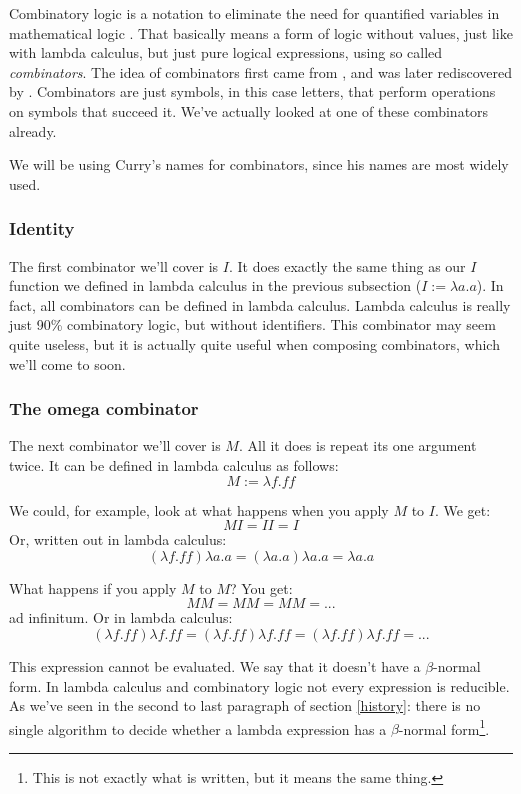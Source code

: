 \documentclass[11pt]{article}
\begin{document}
Combinatory logic is a notation to eliminate the need for quantified variables
in mathematical logic \parencite{wiki:Combinatory_logic}. That basically means
a form of logic without values, just like with lambda calculus, but just pure
logical expressions, using so called \emph{combinators}. The idea of
combinators first came from \textcite{schonfinkel1924}, and was later
rediscovered by \textcite{curry1930}. Combinators are just symbols, in this
case letters, that perform operations on symbols that succeed it. We've
actually looked at one of these combinators already.

We will be using Curry's names for combinators, since his names are most widely
used.

\subsubsection{Identity}

The first combinator we'll cover is \(I\). It does exactly the same thing as
our \(I\) function we defined in lambda calculus in the previous subsection
(\(I:=\lambda a.a\)). In fact, all combinators can be defined in lambda
calculus. Lambda calculus is really just 90\% combinatory logic, but without
identifiers. This combinator may seem quite useless, but it is actually quite
useful when composing combinators, which we'll come to soon.

\subsubsection{The omega combinator}\label{omega}

The next combinator we'll cover is \(M\). All it does is repeat its one
argument twice. It can be defined in lambda calculus as follows:
\[M:=\lambda f.ff\]

We could, for example, look at what happens when you apply \(M\) to \(I\). We
get:
\[M I = I I = I\]
Or, written out in lambda calculus:
\[(\lambda f.ff)\lambda a.a=(\lambda a.a)\lambda a.a=\lambda a.a\]

What happens if you apply \(M\) to \(M\)? You get:
\[M M = M M = M M = ...\]
ad infinitum. Or in lambda calculus:
\[(\lambda f.ff)\lambda f.ff=(\lambda f.ff)\lambda f.ff=(\lambda f.ff)\lambda f.ff=...\]

This expression cannot be evaluated. We say that it doesn't have a
\(\beta\)-normal form. In lambda calculus and combinatory logic not every
expression is reducible. As we've seen in the second to last paragraph of
section \ref{history}: there is no single algorithm to decide whether a lambda
expression has a \(\beta\)-normal form\footnote{This is not exactly what is
written, but it means the same thing.}.
\end{document}
